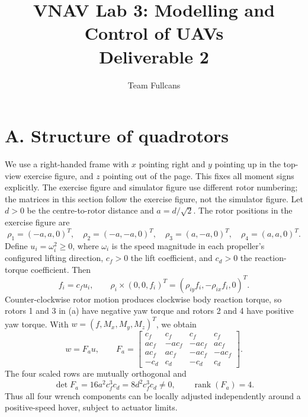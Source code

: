 \documentclass[11pt,a4paper]{article}
\title{VNAV Lab 3: Modelling and Control of UAVs\\Deliverable 2}
\author{Team Fullcans}
\date{}
\begin{document}
\maketitle

\section*{A. Structure of quadrotors}
We use a right-handed frame with $x$ pointing right and $y$ pointing up in
the top-view exercise figure, and $z$ pointing out of the page. This fixes
all moment signs explicitly. The exercise figure and simulator figure use
different rotor numbering; the matrices in this section follow the exercise
figure, not the simulator figure.
Let $d>0$ be the centre-to-rotor distance and $a=d/\sqrt{2}$. The rotor
positions in the exercise figure are
\[
 \rho_1=(-a,a,0)^T,\quad \rho_2=(-a,-a,0)^T,\quad
 \rho_3=(a,-a,0)^T,\quad \rho_4=(a,a,0)^T.
\]
Define $u_i=\omega_i^2\geq0$, where $\omega_i$ is the speed magnitude in
each propeller's configured lifting direction, $c_f>0$ the lift coefficient,
and $c_d>0$ the reaction-torque coefficient. Then
\[
 f_i=c_fu_i,\qquad
 \rho_i\times (0,0,f_i)^T=(\rho_{iy}f_i,-\rho_{ix}f_i,0)^T.
\]
Counter-clockwise rotor motion produces clockwise body reaction torque,
so rotors 1 and 3 in (a) have negative yaw torque and rotors 2 and 4 have
positive yaw torque. With $w=(f,M_x,M_y,M_z)^T$, we obtain
\begin{equation}
 w=F_a u,\qquad
 F_a=\begin{bmatrix}
 c_f&c_f&c_f&c_f\\
 ac_f&-ac_f&-ac_f&ac_f\\
 ac_f&ac_f&-ac_f&-ac_f\\
 -c_d&c_d&-c_d&c_d
 \end{bmatrix}.
\end{equation}
The four scaled rows are mutually orthogonal and
\[
 \det F_a=16a^2c_f^3c_d=8d^2c_f^3c_d\ne0,
 \qquad \operatorname{rank}(F_a)=4.
\]
Thus all four wrench components can be locally adjusted independently
around a positive-speed hover, subject to actuator limits.
\end{document}
